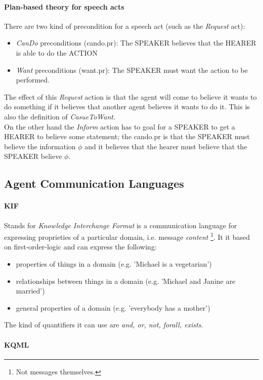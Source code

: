 \documentclass[10pt,a4paper]{article}
\begin{document}
\paragraph{Plan-based theory for speech acts}
There are two kind of precondition for a speech act (such as the \textit{Request} act):
\begin{itemize}
\item \textit{CanDo} preconditions (cando.pr): The SPEAKER believes that the HEARER is able to do the ACTION
\item \textit{Want} preconditions (want.pr): The SPEAKER must want the action to be performed.
\end{itemize}

The effect of this \textit{Request} action is that the agent will come to believe it wants to do something if it believes that another agent believes it wants to do it. This is also the definition of \textit{CasueToWant}.\\
On the other hand the \textit{Inform} action has to goal for a SPEAKER to get a HEARER to believe some statement; the cando.pr is that the SPEAKER must believe the information $\phi$ and it believes that the hearer must believe that the SPEAKER believe $\phi$.


\subsection{Agent Communication Languages}

\paragraph{KIF}
Stands for \textit{Knowledge Interchange Format} is a communication language for expressing proprieties of a particular domain, i.e. message \textit{content} \footnote{Not messages themselves.}. It it based on first-order-logic and can express the following:
\begin{itemize}
\item properties of things in a domain (e.g. 'Michael is a vegetarian')
\item relationships between things in a domain (e.g. 'Michael and Janine are married')
\item general properties of a domain (e.g. 'everybody has a mother') 
\end{itemize}

The kind of quantifiers it can use are \textit{and, or, not, forall, exists}.

\paragraph{KQML}
\end{document}
